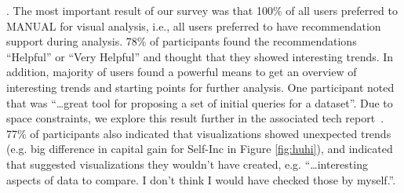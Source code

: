 . 
The most important result of our survey was that 100\% of all users preferred \SeeDB to MANUAL for
visual analysis, i.e., all users preferred to have recommendation support during analysis.
78\% of participants found the recommendations ``Helpful'' or ``Very Helpful'' and thought that they
showed interesting trends.
In addition, majority of users found \SeeDB a powerful means to get an overview of interesting trends
and starting points for further analysis. 
One participant noted that \SeeDB was ``\ldots great tool for proposing a set of initial queries for a dataset''.
Due to space constraints, we explore this result further in the associated tech report~\cite{seedb-tr}.
77\% of participants also indicated that \SeeDB visualizations showed unexpected trends (e.g. big difference
in capital gain for Self-Inc in Figure \ref{fig:huhi}), and indicated that \SeeDB suggested visualizations
they wouldn't have created,
e.g. ``\ldots interesting aspects of data to compare. I don't think I would have checked those by myself.''.

